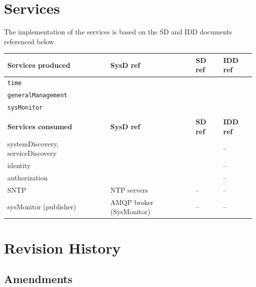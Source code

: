 \documentclass[a4paper]{arrowhead}
\begin{document}
\newpage

\section{Services}
\label{sec:services}

The implementation of the services is based on the SD and IDD documents referenced below.

\noindent\begin{longtable}{| p{5.4cm} | p{2.2cm} | p{2.2cm} | p{4.8cm} |} \hline
\rowcolor{gray!33}\textbf{Services produced} & \textbf{SysD ref} & \textbf{SD ref} & \textbf{IDD ref} \\ \hline \endhead
\texttt{time} & \cite{tim-sysd} & \cite{tim-time-sd} & \cite{tim-time-http-idd} \\ \hline
\texttt{generalManagement} & \cite{tim-sysd} & \cite{tim-generalManagement-sd} & \cite{tim-generalManagement-http-idd} \\ \hline
\texttt{sysMonitor} & \cite{tim-sysd} & \cite{tim-sysMonitor-sd} & \cite{tim-sysMonitor-amqp-idd} \\ \hline
&&& \\ \hline
\rowcolor{gray!33}\textbf{Services consumed} & \textbf{SysD ref} & \textbf{SD ref} & \textbf{IDD ref} \\ \hline
systemDiscovery, serviceDiscovery & \cite{core-sr-sysd} & \cite{core-sr-systemDiscovery-sd} & -- \\ \hline
identity & \cite{core-auth-sysd} & \cite{core-auth-identity-sd} & -- \\ \hline
authorization & \cite{core-ca-sysd} & \cite{core-ca-authorization-sd} & -- \\ \hline
SNTP & NTP servers & -- & -- \\ \hline
sysMonitor (publisher) & AMQP broker (SysMonitor) & -- & -- \\ \hline
\end{longtable}





\newpage

\section{Revision History}
\subsection{Amendments}
\end{document}
